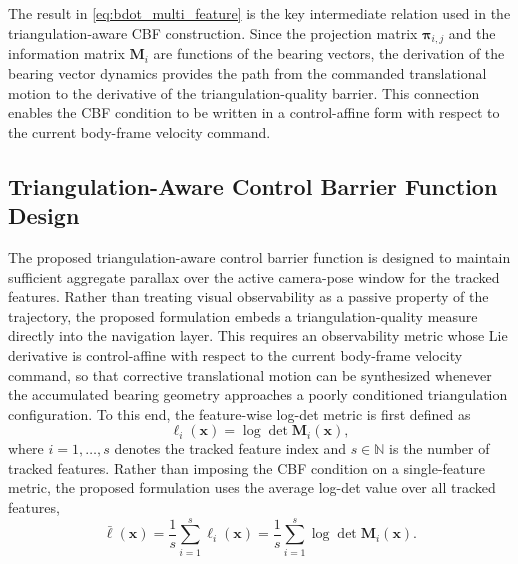 \documentclass[journal]{IEEEtran}
\begin{document}
The result in \eqref{eq:bdot_multi_feature} is the key intermediate relation
used in the triangulation-aware CBF construction. Since the projection matrix
$\bm{\pi}_{i,j}$ and the information matrix $\bm{M}_i$ are functions of the
bearing vectors, the derivation of the bearing vector dynamics provides the path from the commanded translational motion to the derivative of the triangulation-quality barrier. This connection enables the CBF condition to be written in a control-affine form with respect to the current body-frame velocity command.




\subsection{Triangulation-Aware Control Barrier Function Design}
\label{cbfDesign}

The proposed triangulation-aware control barrier function is designed to maintain sufficient aggregate parallax over the active camera-pose window for the tracked features. Rather than treating visual observability as a passive property of the trajectory, the proposed formulation embeds a triangulation-quality measure directly into the navigation layer. This requires an observability metric whose Lie derivative is control-affine with respect to the current body-frame velocity command, so that corrective translational motion can be synthesized whenever the accumulated bearing geometry approaches a poorly conditioned triangulation configuration. To this end, the feature-wise log-det metric is first defined as
\begin{equation}
  \ell_i(\bm{x}) = \log\det\bm{M}_{i}(\bm{x}),
  \label{eq:ell_i_def}
\end{equation}
where $i = 1,\ldots,s$ denotes the tracked feature index and $s \in \mathbb{N}$ is the number of tracked features. Rather than imposing the CBF condition on a single-feature metric, the proposed formulation uses the average log-det value over all tracked features,
\begin{equation}
  \bar{\ell}(\bm{x})
  = \frac{1}{s}\sum_{i=1}^{s}\ell_i(\bm{x})
  = \frac{1}{s}\sum_{i=1}^{s}\log\det\bm{M}_{i}(\bm{x}).
  \label{eq:average_logdet}
\end{equation}
\end{document}
